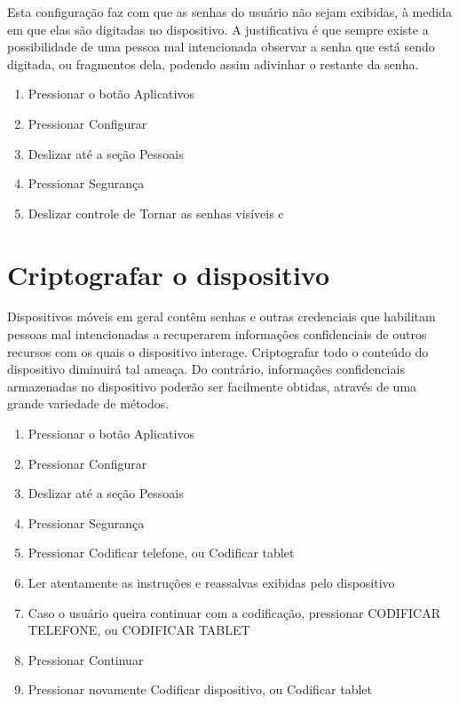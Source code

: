 Esta configura\c c\~ao faz com que as senhas do usu\'ario n\~ao sejam exibidas, \`a medida em que elas s\~ao digitadas no dispositivo. A justificativa \' e que sempre existe a possibilidade de uma pessoa mal intencionada observar a senha que est\'a sendo digitada, ou fragmentos dela, podendo assim adivinhar o restante da senha.

\begin{enumerate}
\item Pressionar o bot\~ao Aplicativos
\item Pressionar Configurar
\item Deslizar at\'e a se\c c\~ao Pessoais
\item Pressionar Seguran\c ca
\item Deslizar controle de Tornar as senhas vis\'iveis c	
\end{enumerate}

\section{Criptografar o dispositivo}

Dispositivos m\'oveis em geral cont\^em senhas e outras credenciais que habilitam pessoas mal intencionadas a recuperarem informa\c c\~oes confidenciais de outros recursos com os quais o dispositivo interage. Criptografar todo o conte\'udo do dispositivo diminuir\'a tal amea\c ca. Do contr\'ario, informa\c c\~oes confidenciais armazenadas no dispositivo poder\~ao ser facilmente obtidas, atrav\'es de uma grande variedade de m\'etodos.

\begin{enumerate}
\item Pressionar o bot\~ao Aplicativos
\item Pressionar Configurar
\item Deslizar at\'e a se\c c\~ao Pessoais
\item Pressionar Seguran\c ca
\item Pressionar Codificar telefone, ou Codificar tablet
\item Ler atentamente as instru\c c\~oes e reassalvas exibidas pelo dispositivo
\item Caso o usu\'ario queira continuar com a codifica\c c\~ao, pressionar CODIFICAR TELEFONE, ou CODIFICAR TABLET
\item Pressionar Continuar
\item Pressionar novamente Codificar dispositivo, ou Codificar tablet
\end{enumerate}

